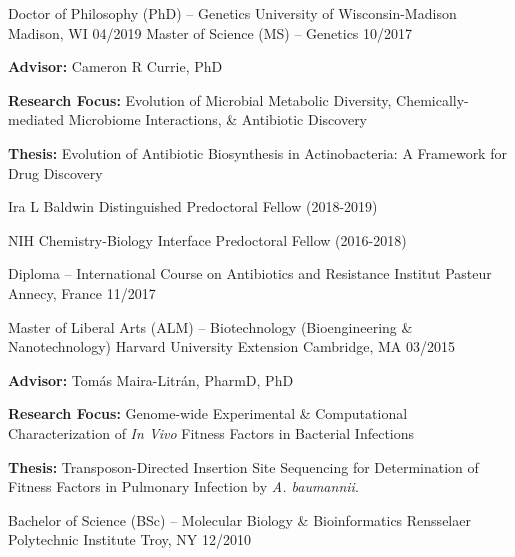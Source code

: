 {}

\begin{cventries}
\cventry
	{Doctor of Philosophy (PhD) -- Genetics}
	{University of Wisconsin-Madison}
	{Madison, WI}
	{04/2019}
	{}
	\vspace{-0.4cm}
\cventry
	{Master of Science (MS) -- Genetics}
	{}
	{}
	{10/2017}
	{
      \begin{cvitems}
      	\item {\textbf{Advisor:} Cameron R Currie, PhD}
      	\item {\textbf{Research Focus:} Evolution of Microbial Metabolic Diversity, Chemically-mediated Microbiome Interactions, \& Antibiotic Discovery}
      	\item {\textbf{Thesis:} Evolution of Antibiotic Biosynthesis in Actinobacteria: A Framework for Drug Discovery}
      	\item {Ira L Baldwin Distinguished Predoctoral Fellow (2018-2019)}
      	\item {NIH Chemistry-Biology Interface Predoctoral Fellow (2016-2018)}
      \end{cvitems}
    }
    
\cventry
	{Diploma -- International Course on Antibiotics and Resistance}
	{Institut Pasteur}
	{Annecy, France}
	{11/2017}
	{} \vspace{-4mm}
    
\cventry
	{Master of Liberal Arts (ALM) -- Biotechnology (Bioengineering \& Nanotechnology)}
	{Harvard University Extension}
	{Cambridge, MA}
	{03/2015}
	{
      \begin{cvitems}
      	\item {\textbf{Advisor:} Tom\'{a}s Maira-Litr\'{a}n, PharmD, PhD}
      	\item {\textbf{Research Focus:} Genome-wide Experimental \& Computational Characterization of \textit{In Vivo} Fitness Factors in Bacterial Infections}
      	\item {\textbf{Thesis:} Transposon-Directed Insertion Site Sequencing for Determination of Fitness Factors in Pulmonary Infection by \textit{A. baumannii}.}
      \end{cvitems}
    }

\cventry
	{Bachelor of Science (BSc) -- Molecular Biology \& Bioinformatics}
	{Rensselaer Polytechnic Institute}
	{Troy, NY}
	{12/2010}
	{}
\end{cventries}

\vspace{-7mm}